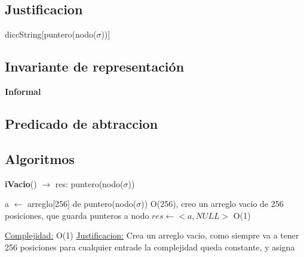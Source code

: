\begin{Representacion}
\subsection{Justificacion}
	\begin{Estructura}{diccString}[puntero(nodo($\sigma$))]
		\begin{Tupla}[nodo]
		\end{Tupla}
	\end{Estructura}
\subsection{Invariante de representación}

\textbf{Informal}


\subsection{Predicado de abtraccion}


\subsection{Algoritmos}

\begin{Algoritmos}

\begin{algorithm}[H]{\textbf{iVacio}() $\to$ res: puntero(nodo($\sigma$))}
	\begin{algorithmic}[1]
		\State a $\gets$ arreglo[256] de puntero(nodo($\sigma$)) \Comment O(256), creo un arreglo vacio de 256 posiciones, que guarda punteros a nodo
		\State $res \gets <a, NULL>$ \Comment O(1)
		
		\medskip
		\Statex \underline{Complejidad:} O(1)
			\Statex \underline{Justificacion:} Crea un arreglo vacio, como siempre va a tener 256 posiciones para cualquier entrade la complejidad queda constante, y asigna 
	\end{algorithmic}
\end{algorithm}



\end{Algoritmos}
\end{Representacion}
